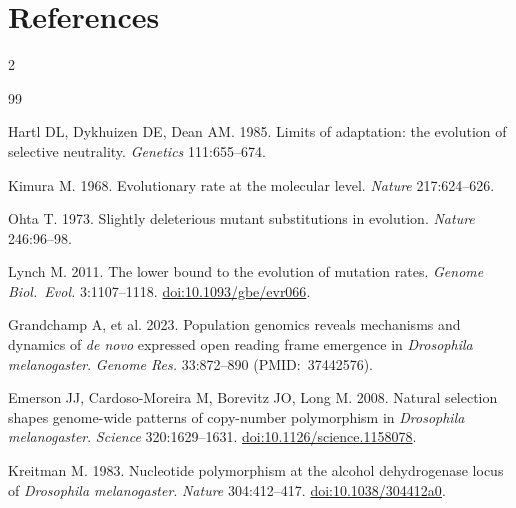 \documentclass[10pt]{article}
\begin{document}
\section*{References}
\renewcommand{\bibsection}{}
\begingroup
\setlength{\bibsep}{1pt plus 0.2ex}
\footnotesize
\begin{multicols}{2}
\begin{thebibliography}{99}

Hartl DL, Dykhuizen DE, Dean AM. 1985.
Limits of adaptation: the evolution of selective neutrality.
\textit{Genetics} 111:655--674.

Kimura M. 1968.
Evolutionary rate at the molecular level.
\textit{Nature} 217:624--626.

Ohta T. 1973.
Slightly deleterious mutant substitutions in evolution.
\textit{Nature} 246:96--98.

Lynch M. 2011.
The lower bound to the evolution of mutation rates.
\textit{Genome Biol.\ Evol.} 3:1107--1118.
\href{https://doi.org/10.1093/gbe/evr066}{doi:10.1093/gbe/evr066}.

Grandchamp A, et al. 2023.
Population genomics reveals mechanisms and dynamics of \emph{de novo} expressed open reading frame
emergence in \textit{Drosophila melanogaster}.
\textit{Genome Res.} 33:872--890 (PMID:~37442576).

Emerson JJ, Cardoso-Moreira M, Borevitz JO, Long M. 2008.
Natural selection shapes genome-wide patterns of copy-number polymorphism in
\textit{Drosophila melanogaster}.
\textit{Science} 320:1629--1631.
\href{https://doi.org/10.1126/science.1158078}{doi:10.1126/science.1158078}.

Kreitman M. 1983.
Nucleotide polymorphism at the alcohol dehydrogenase locus of \textit{Drosophila melanogaster}.
\textit{Nature} 304:412--417.
\href{https://doi.org/10.1038/304412a0}{doi:10.1038/304412a0}.

\end{thebibliography}
\end{multicols}
\endgroup
\end{document}
